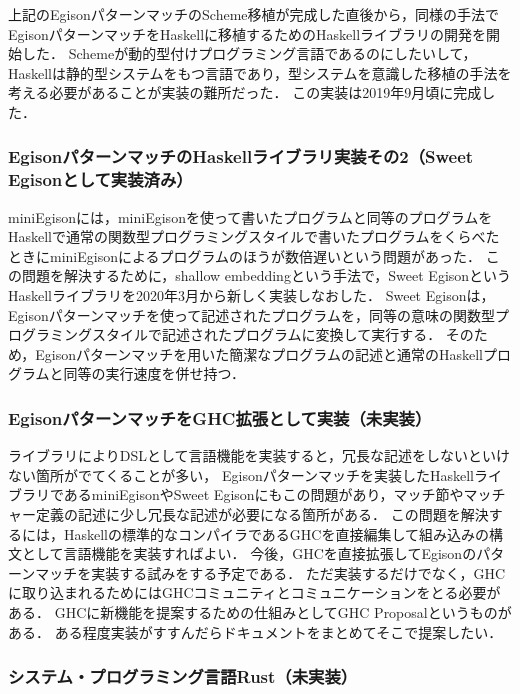 上記のEgisonパターンマッチのScheme移植が完成した直後から，同様の手法でEgisonパターンマッチをHaskellに移植するためのHaskellライブラリの開発を開始した．
Schemeが動的型付けプログラミング言語であるのにしたいして，Haskellは静的型システムをもつ言語であり，型システムを意識した移植の手法を考える必要があることが実装の難所だった．
この実装は2019年9月頃に完成した．

\subsubsection{EgisonパターンマッチのHaskellライブラリ実装その2（Sweet Egisonとして実装済み）}\label{direction-language-haskell2}

miniEgisonには，miniEgisonを使って書いたプログラムと同等のプログラムをHaskellで通常の関数型プログラミングスタイルで書いたプログラムをくらべたときにminiEgisonによるプログラムのほうが数倍遅いという問題があった．
この問題を解決するために，shallow embeddingという手法で，Sweet EgisonというHaskellライブラリを2020年3月から新しく実装しなおした．
Sweet Egisonは，Egisonパターンマッチを使って記述されたプログラムを，同等の意味の関数型プログラミングスタイルで記述されたプログラムに変換して実行する．
そのため，Egisonパターンマッチを用いた簡潔なプログラムの記述と通常のHaskellプログラムと同等の実行速度を併せ持つ．

\subsubsection{EgisonパターンマッチをGHC拡張として実装（未実装）}\label{direction-language-ghc}

ライブラリによりDSLとして言語機能を実装すると，冗長な記述をしないといけない箇所がでてくることが多い，
Egisonパターンマッチを実装したHaskellライブラリであるminiEgisonやSweet Egisonにもこの問題があり，マッチ節やマッチャー定義の記述に少し冗長な記述が必要になる箇所がある．
この問題を解決するには，Haskellの標準的なコンパイラであるGHCを直接編集して組み込みの構文として言語機能を実装すればよい．
今後，GHCを直接拡張してEgisonのパターンマッチを実装する試みをする予定である．
ただ実装するだけでなく，GHCに取り込まれるためにはGHCコミュニティとコミュニケーションをとる必要がある．
GHCに新機能を提案するための仕組みとしてGHC Proposalというものがある．
ある程度実装がすすんだらドキュメントをまとめてそこで提案したい．

\subsubsection{システム・プログラミング言語Rust（未実装）}\label{direction-language-rust}

